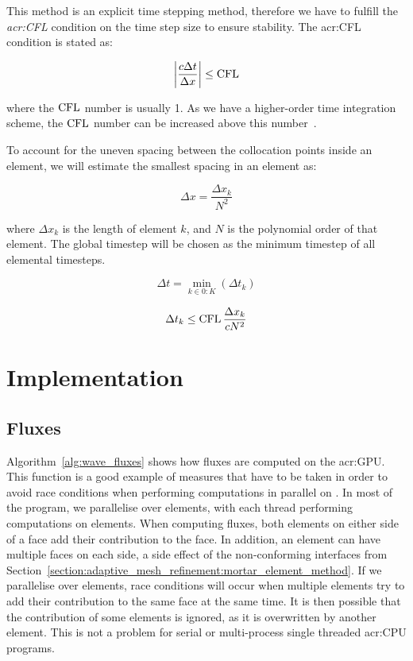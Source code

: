 This method is an explicit time stepping method, therefore we have to fulfill the
\textit{\acrfull{acr:CFL}} condition on the time step size to ensure stability. The
\acrshort{acr:CFL} condition is stated as:

\begin{equation}
	\left| \frac{c \Delta t}{\Delta x} \right| \leq \operatorname{CFL}
\end{equation}

\noindent
where the \(\operatorname{CFL} \) number is usually 1. As we have a higher-order time integration scheme, the
\(\operatorname{CFL} \) number can be increased above this number~\cite{Gottlieb2001}.

To account for the uneven spacing between the collocation points inside an element, we will estimate
the smallest spacing in an element as: 

\begin{equation}
    \Delta x = \frac{\Delta x_k}{N^2}
\end{equation}

\noindent
where \(\Delta x_k\) is the length of element \(k\), and \(N\) is the polynomial order of that
element. The global timestep will be chosen as the minimum timestep of all elemental timesteps. 

\begin{equation}
    \Delta t = \min_{k \in 0:K} \left( \Delta t_k \right)
\end{equation}

\begin{equation}
    \Delta t_k \leq \operatorname{CFL} \frac{\Delta x_k}{cN^2}
\end{equation}

\section{Implementation}\label{section:spectral_element_method:implementation}

\subsection{Fluxes}\label{subsection:spectral_element_method:implementation:fluxes}

Algorithm~\ref{alg:wave_fluxes} shows how fluxes are computed on the \acrshort{acr:GPU}. This
function is a good example of measures that have to be taken in order to avoid race conditions when
performing computations in parallel on . In most of the program, we parallelise
over elements, with each thread performing computations on elements. When computing fluxes, both
elements on either side of a face add their contribution to the face. In addition, an element can
have multiple faces on each side, a side effect of the non-conforming interfaces from
Section~\ref{section:adaptive_mesh_refinement:mortar_element_method}. If we parallelise over
elements, race conditions will occur when multiple elements try to add their contribution to the
same face at the same time. It is then possible that the contribution of some elements is ignored,
as it is overwritten by another element. This is not a problem for serial or multi-process single
threaded \acrshort{acr:CPU} programs.

